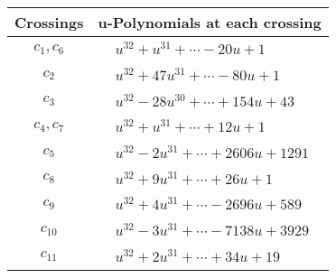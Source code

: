 \documentclass[1p]{elsarticle_modified}
\theoremstyle{definition}
\begin{document}
\begin{tabular}{m{50pt}|m{274pt}}
Crossings & \hspace{64pt}u-Polynomials at each crossing \\
\hline $$\begin{aligned}c_{1},c_{6}\end{aligned}$$&$\begin{aligned}
&u^{32}+u^{31}+\cdots-20 u+1
\end{aligned}$\\
\hline $$\begin{aligned}c_{2}\end{aligned}$$&$\begin{aligned}
&u^{32}+47 u^{31}+\cdots-80 u+1
\end{aligned}$\\
\hline $$\begin{aligned}c_{3}\end{aligned}$$&$\begin{aligned}
&u^{32}-28 u^{30}+\cdots+154 u+43
\end{aligned}$\\
\hline $$\begin{aligned}c_{4},c_{7}\end{aligned}$$&$\begin{aligned}
&u^{32}+u^{31}+\cdots+12 u+1
\end{aligned}$\\
\hline $$\begin{aligned}c_{5}\end{aligned}$$&$\begin{aligned}
&u^{32}-2 u^{31}+\cdots+2606 u+1291
\end{aligned}$\\
\hline $$\begin{aligned}c_{8}\end{aligned}$$&$\begin{aligned}
&u^{32}+9 u^{31}+\cdots+26 u+1
\end{aligned}$\\
\hline $$\begin{aligned}c_{9}\end{aligned}$$&$\begin{aligned}
&u^{32}+4 u^{31}+\cdots-2696 u+589
\end{aligned}$\\
\hline $$\begin{aligned}c_{10}\end{aligned}$$&$\begin{aligned}
&u^{32}-3 u^{31}+\cdots-7138 u+3929
\end{aligned}$\\
\hline $$\begin{aligned}c_{11}\end{aligned}$$&$\begin{aligned}
&u^{32}+2 u^{31}+\cdots+34 u+19
\end{aligned}$\\
\hline
\end{tabular}\\~\\
\end{document}
